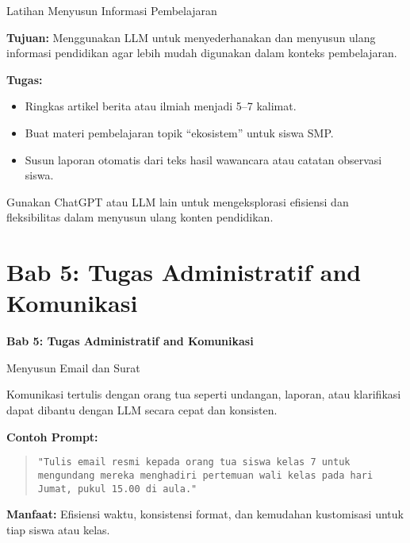 \documentclass[aspectratio=169, table]{beamer}
\begin{document}
\begin{frame}[fragile]{Latihan Menyusun Informasi Pembelajaran }
	\vspace{20pt}
	
	\textbf{Tujuan:}  
	Menggunakan LLM untuk menyederhanakan dan menyusun ulang informasi pendidikan agar lebih mudah digunakan dalam konteks pembelajaran.
	
	\textbf{Tugas:}
	\begin{itemize}
		\item Ringkas artikel berita atau ilmiah menjadi 5–7 kalimat.
		\item Buat materi pembelajaran topik “ekosistem” untuk siswa SMP.
		\item Susun laporan otomatis dari teks hasil wawancara atau catatan observasi siswa.
	\end{itemize}
	
	Gunakan ChatGPT atau LLM lain untuk mengeksplorasi efisiensi dan fleksibilitas dalam menyusun ulang konten pendidikan.
\end{frame}


\section{Bab 5: Tugas Administratif and Komunikasi}
\begin{frame}{\hfill}
	\centering
	\Huge{\textbf{Bab 5: Tugas Administratif and Komunikasi}}
\end{frame}	

\begin{frame}[fragile]{Menyusun Email dan Surat}
	\vspace{20pt}
	
	Komunikasi tertulis dengan orang tua seperti undangan, laporan, atau klarifikasi dapat dibantu dengan LLM secara cepat dan konsisten.
	
	\vspace{10pt}
	\textbf{Contoh Prompt:}
	\begin{quote}
		\centering
		\texttt{"Tulis email resmi kepada orang tua siswa kelas 7 untuk mengundang mereka menghadiri pertemuan wali kelas pada hari Jumat, pukul 15.00 di aula."}
	\end{quote}
	
	\vspace{10pt}
	\textbf{Manfaat:} Efisiensi waktu, konsistensi format, dan kemudahan kustomisasi untuk tiap siswa atau kelas.
\end{frame}
\end{document}
